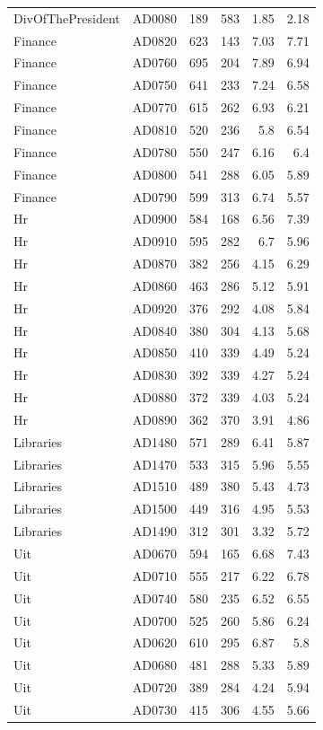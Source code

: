 \documentclass[article,10pt,microtype]{article}
\begin{document}
\begin{longtable}{llrrrr}
DivOfThePresident & AD0080 & 189 & 583 & 1.85 & 2.18\\
Finance & AD0820 & 623 & 143 & 7.03 & 7.71\\
Finance & AD0760 & 695 & 204 & 7.89 & 6.94\\
Finance & AD0750 & 641 & 233 & 7.24 & 6.58\\
Finance & AD0770 & 615 & 262 & 6.93 & 6.21\\
Finance & AD0810 & 520 & 236 & 5.8 & 6.54\\
Finance & AD0780 & 550 & 247 & 6.16 & 6.4\\
Finance & AD0800 & 541 & 288 & 6.05 & 5.89\\
Finance & AD0790 & 599 & 313 & 6.74 & 5.57\\
Hr & AD0900 & 584 & 168 & 6.56 & 7.39\\
Hr & AD0910 & 595 & 282 & 6.7 & 5.96\\
Hr & AD0870 & 382 & 256 & 4.15 & 6.29\\
Hr & AD0860 & 463 & 286 & 5.12 & 5.91\\
Hr & AD0920 & 376 & 292 & 4.08 & 5.84\\
Hr & AD0840 & 380 & 304 & 4.13 & 5.68\\
Hr & AD0850 & 410 & 339 & 4.49 & 5.24\\
Hr & AD0830 & 392 & 339 & 4.27 & 5.24\\
Hr & AD0880 & 372 & 339 & 4.03 & 5.24\\
Hr & AD0890 & 362 & 370 & 3.91 & 4.86\\
Libraries & AD1480 & 571 & 289 & 6.41 & 5.87\\
Libraries & AD1470 & 533 & 315 & 5.96 & 5.55\\
Libraries & AD1510 & 489 & 380 & 5.43 & 4.73\\
Libraries & AD1500 & 449 & 316 & 4.95 & 5.53\\
Libraries & AD1490 & 312 & 301 & 3.32 & 5.72\\
Uit & AD0670 & 594 & 165 & 6.68 & 7.43\\
Uit & AD0710 & 555 & 217 & 6.22 & 6.78\\
Uit & AD0740 & 580 & 235 & 6.52 & 6.55\\
Uit & AD0700 & 525 & 260 & 5.86 & 6.24\\
Uit & AD0620 & 610 & 295 & 6.87 & 5.8\\
Uit & AD0680 & 481 & 288 & 5.33 & 5.89\\
Uit & AD0720 & 389 & 284 & 4.24 & 5.94\\
Uit & AD0730 & 415 & 306 & 4.55 & 5.66\\

\end{longtable}
\end{document}
